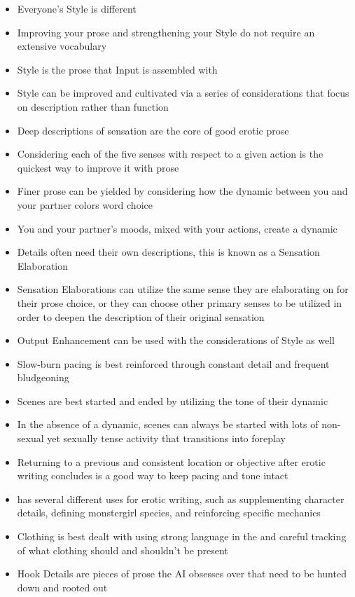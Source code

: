\documentclass[Coomer-main.tex]{subfiles}
\begin{document}
\begin{itemize}
\item{Everyone's Style is different}
\item{Improving your prose and strengthening your Style do not require an extensive vocabulary}
\item{Style is the prose that Input is assembled with}
\item{Style can be improved and cultivated via a series of considerations that focus on description rather than function}
\item{Deep descriptions of sensation are the core of good erotic prose}
\item{Considering each of the five senses with respect to a given action is the quickest way to improve it with prose}
\item{Finer prose can be yielded by considering how the dynamic between you and your partner colors word choice}
\item{You and your partner's moods, mixed with your actions, create a dynamic}
\item{Details often need their own descriptions, this is known as a Sensation Elaboration}
\item{Sensation Elaborations can utilize the same sense they are elaborating on for their prose choice, or they can choose other primary senses to be utilized in order to deepen the description of their original sensation}
\item{Output Enhancement can be used with the considerations of Style as well}

\item{Slow-burn pacing is best reinforced through constant detail and frequent bludgeoning}
\item{Scenes are best started and ended by utilizing the tone of their dynamic}
\item{In the absence of a dynamic, scenes can always be started with lots of non-sexual yet sexually tense activity that transitions into foreplay}
\item{Returning to a previous and consistent location or objective after erotic writing concludes is a good way to keep pacing and tone intact}
\item{\wi has several different uses for erotic writing, such as supplementing character details, defining monstergirl species, and reinforcing specific mechanics}
\item{Clothing is best dealt with using strong language in the \rem and careful tracking of what clothing should and shouldn't be present}
\item{Hook Details are pieces of prose the AI obsesses over that need to be hunted down and rooted out}

\end{itemize}
\end{document}
